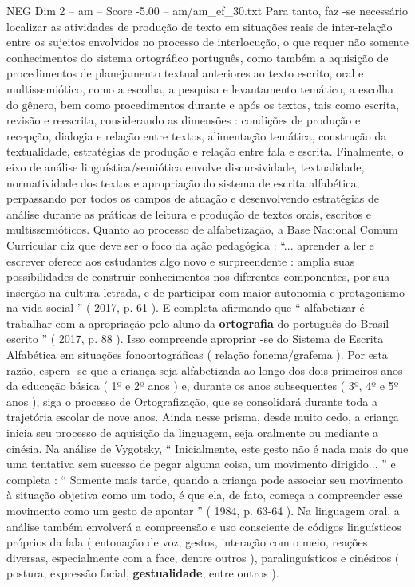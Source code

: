 \begin{textsample}{NEG Dim 2 – am – Score -5.00 – am/am\_ef\_30.txt}
Para tanto, faz -se necessário localizar as atividades de produção de texto em situações reais de inter-relação entre os sujeitos envolvidos no processo de interlocução, o que requer não somente conhecimentos do sistema ortográfico português, como também a aquisição de procedimentos de planejamento textual anteriores ao texto escrito, oral e multissemiótico, como a escolha, a pesquisa e levantamento temático, a escolha do gênero, bem como procedimentos durante e após os textos, tais como escrita, revisão e reescrita, considerando as dimensões : condições de produção e recepção, dialogia e relação entre textos, alimentação temática, construção da textualidade, estratégias de produção e relação entre fala e escrita.
Finalmente, o eixo de análise linguística/semiótica envolve discursividade, textualidade, normatividade dos textos e apropriação do sistema de escrita alfabética, perpassando por todos os campos de atuação e desenvolvendo estratégias de análise durante as práticas de leitura e produção de textos orais, escritos e multissemióticos.
Quanto ao processo de alfabetização, a Base Nacional Comum Curricular diz que deve ser o foco da ação pedagógica : “... aprender a ler e escrever oferece aos estudantes algo novo e surpreendente : amplia suas possibilidades de construir conhecimentos nos diferentes componentes, por sua inserção na cultura letrada, e de participar com maior autonomia e protagonismo na vida social ” ( 2017, p. 61 ).
E completa afirmando que “ alfabetizar é trabalhar com a apropriação pelo aluno da \textbf{ortografia} do português do Brasil escrito ” ( 2017, p. 88 ).
Isso compreende apropriar -se do Sistema de Escrita Alfabética em situações fonoortográficas ( relação fonema/grafema ).
Por esta razão, espera -se que a criança seja alfabetizada ao longo dos dois primeiros anos da educação básica ( 1º e 2º anos ) e, durante os anos subsequentes ( 3º, 4º e 5º anos ), siga o processo de Ortografização, que se consolidará durante toda a trajetória escolar de nove anos.
Ainda nesse prisma, desde muito cedo, a criança inicia seu processo de aquisição da linguagem, seja oralmente ou mediante a cinésia.
Na análise de Vygotsky, “ Inicialmente, este gesto não é nada mais do que uma tentativa sem sucesso de pegar alguma coisa, um movimento dirigido... ” e completa : “ Somente mais tarde, quando a criança pode associar seu movimento à situação objetiva como um todo, é que ela, de fato, começa a compreender esse movimento como um gesto de apontar ” ( 1984, p. 63-64 ).
Na linguagem oral, a análise também envolverá a compreensão e uso consciente de códigos linguísticos próprios da fala ( entonação de voz, gestos, interação com o meio, reações diversas, especialmente com a face, dentre outros ), paralinguísticos e cinésicos ( postura, expressão facial, \textbf{gestualidade}, entre outros ).

\end{textsample}
